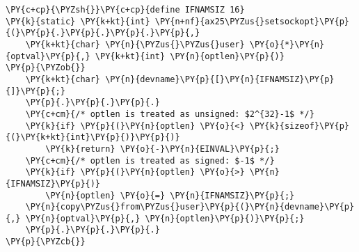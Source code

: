 \begin{Verbatim}[commandchars=\\\{\},codes={\catcode`\$=3\catcode`\^=7\catcode`\_=8}]
\PY{c+cp}{\PYZsh{}}\PY{c+cp}{define IFNAMSIZ 16}
\PY{k}{static} \PY{k+kt}{int} \PY{n+nf}{ax25\PYZus{}setsockopt}\PY{p}{(}\PY{p}{.}\PY{p}{.}\PY{p}{.}\PY{p}{,}
    \PY{k+kt}{char} \PY{n}{\PYZus{}\PYZus{}user} \PY{o}{*}\PY{n}{optval}\PY{p}{,} \PY{k+kt}{int} \PY{n}{optlen}\PY{p}{)}
\PY{p}{\PYZob{}}
    \PY{k+kt}{char} \PY{n}{devname}\PY{p}{[}\PY{n}{IFNAMSIZ}\PY{p}{]}\PY{p}{;}
    \PY{p}{.}\PY{p}{.}\PY{p}{.}
    \PY{c+cm}{/* optlen is treated as unsigned: $2^{32}-1$ */}
    \PY{k}{if} \PY{p}{(}\PY{n}{optlen} \PY{o}{<} \PY{k}{sizeof}\PY{p}{(}\PY{k+kt}{int}\PY{p}{)}\PY{p}{)}
        \PY{k}{return} \PY{o}{-}\PY{n}{EINVAL}\PY{p}{;}
    \PY{c+cm}{/* optlen is treated as signed: $-1$ */}
    \PY{k}{if} \PY{p}{(}\PY{n}{optlen} \PY{o}{>} \PY{n}{IFNAMSIZ}\PY{p}{)}
        \PY{n}{optlen} \PY{o}{=} \PY{n}{IFNAMSIZ}\PY{p}{;}
    \PY{n}{copy\PYZus{}from\PYZus{}user}\PY{p}{(}\PY{n}{devname}\PY{p}{,} \PY{n}{optval}\PY{p}{,} \PY{n}{optlen}\PY{p}{)}\PY{p}{;}
    \PY{p}{.}\PY{p}{.}\PY{p}{.}
\PY{p}{\PYZcb{}}
\end{Verbatim}

